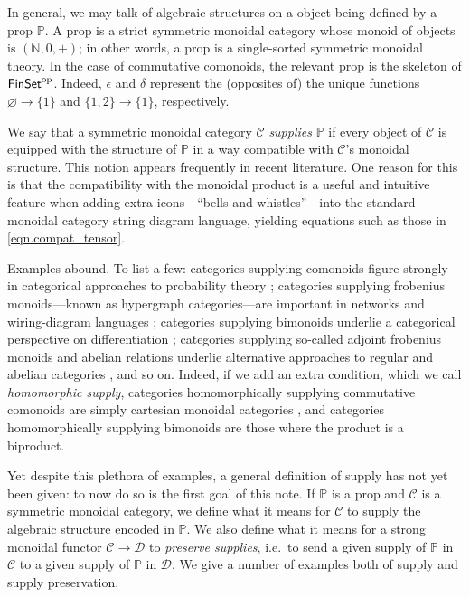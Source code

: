 \documentclass[11pt, oneside, article]{memoir}
\theoremstyle{plain}
\theoremstyle{definition}
\theoremstyle{remark}
\newcommand{\cat}[1]{\mathcal{#1}}%
\newcommand{\Cat}[1]{{\mathsf{#1}}}%
\newcommand{\tn}[1]{\textnormal{#1}}
\newcommand{\op}{^{\tn{op}}}
\newcommand{\finset}{\Cat{FinSet}}
\newcommand{\nn}{\mathbb{N}}
\newcommand{\pp}{\mathbb{P}}
\begin{document}
In general, we may talk of algebraic structures on a object being defined by a prop $\pp$. A prop is a strict symmetric monoidal category whose monoid of objects is $(\nn,0,+)$; in other words, a prop is a single-sorted symmetric monoidal theory. In the case of commutative comonoids, the relevant prop is the skeleton of $\finset\op$. Indeed, $\epsilon$ and $\delta$ represent the (opposites of) the unique functions $\varnothing\to\{1\}$ and $\{1,2\}\to\{1\}$, respectively.

We say that a symmetric monoidal category $\cat{C}$ \emph{supplies} $\pp$ if every object of $\cat{C}$ is equipped with the structure of $\pp$ in a way compatible with $\cat{C}$'s monoidal structure. This notion appears frequently in recent literature. One reason for this is that the compatibility with the monoidal product is a useful and intuitive feature when adding extra icons---``bells and whistles''---into the standard monoidal category string diagram language, yielding equations such as those in \cref{eqn.compat_tensor}.

Examples abound. To list a few: categories supplying comonoids figure strongly in categorical approaches to probability theory \cite{fong2012causal,fritz2019synthetic}; categories supplying frobenius monoids---known as hypergraph categories---are important in networks and wiring-diagram languages \cite{Carboni:1991a,fong2019hypergraph}; categories supplying bimonoids underlie a categorical perspective on differentiation \cite{blute2009cartesian}; categories supplying so-called adjoint frobenius monoids and abelian relations underlie alternative approaches to regular and abelian categories \cite{fong2019abelian}, and so on. Indeed, if we add an extra condition, which we call \emph{homomorphic supply}, categories homomorphically supplying commutative comonoids are simply cartesian monoidal categories \cite{fox1976coalgebras}, and categories homomorphically supplying bimonoids are those where the product is a biproduct.

Yet despite this plethora of examples, a general definition of supply has not yet been given: to now do so is the first goal of this note. If $\pp$ is a prop and $\cat{C}$ is a symmetric monoidal category, we define what it means for $\cat{C}$ to supply the algebraic structure encoded in $\pp$. We also define what it means for a strong monoidal functor $\cat{C}\to\cat{D}$ to \emph{preserve supplies}, i.e.\ to send a given supply of $\pp$ in $\cat{C}$ to a given supply of $\pp$ in $\cat{D}$. We give a number of examples both of supply and supply preservation.
\end{document}
